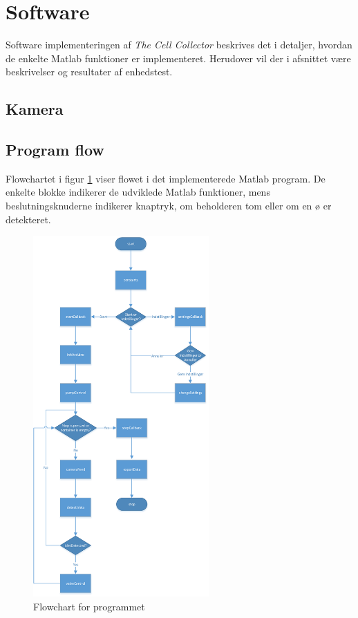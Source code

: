 \section{Software}
Software implementeringen af \textit{The Cell Collector} beskrives det i detaljer, hvordan de enkelte Matlab funktioner er implementeret. Herudover vil der i afsnittet være beskrivelser og resultater af enhedstest. 
 
\subsection{Kamera}



\newpage
\subsection{Program flow}
Flowchartet i figur \ref{fig:softwareFlowchart} viser flowet i det implementerede Matlab program. De enkelte blokke indikerer de udviklede Matlab funktioner, mens beslutningsknuderne indikerer knaptryk, om beholderen tom eller om en ø er detekteret. 
\begin{figure}[H]
	\centering
	\includegraphics[width=0.6\textwidth]{billeder/software/software_flowchart-crop.pdf}
	\caption{Flowchart for programmet}
	\label{fig:softwareFlowchart}
\end{figure}

